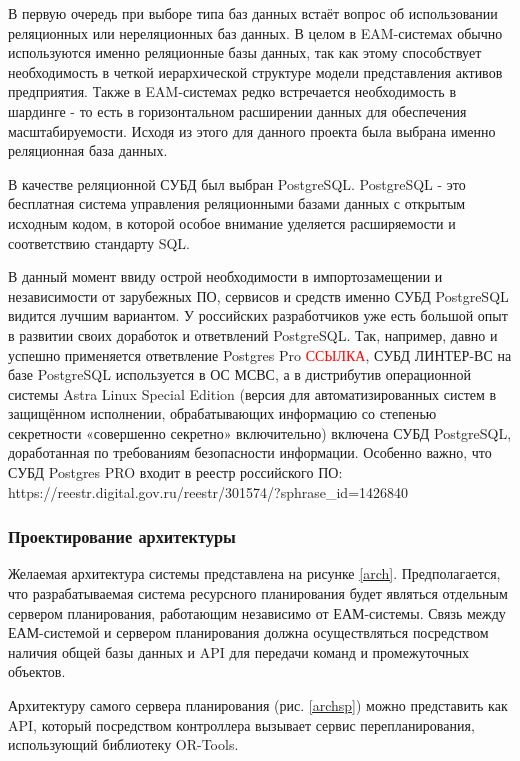 В первую очередь при выборе типа баз данных встаёт вопрос об использовании реляционных или нереляционных баз данных. В целом в EAM-системах обычно используются именно реляционные базы данных, так как этому способствует необходимость в четкой иерархической структуре модели представления активов предприятия. Также в EAM-системах редко встречается необходимость в шардинге - то есть в горизонтальном расширении данных для обеспечения масштабируемости. Исходя из этого для данного проекта была выбрана именно реляционная база данных.

В качестве реляционной СУБД был выбран PostgreSQL. PostgreSQL - это бесплатная система управления реляционными базами данных с открытым исходным кодом, в которой особое внимание уделяется расширяемости и соответствию стандарту SQL.

В данный момент ввиду острой необходимости в импортозамещении и независимости от зарубежных ПО, сервисов и средств именно СУБД PostgreSQL видится лучшим вариантом. У российских разработчиков уже есть большой опыт в развитии своих доработок и ответвлений PostgreSQL. Так, например, давно и успешно применяется ответвление Postgres Pro \textcolor{red}{ССЫЛКА}, СУБД ЛИНТЕР-ВС на базе PostgreSQL используется в ОС МСВС, а в дистрибутив операционной системы Astra Linux Special Edition (версия для автоматизированных систем в защищённом исполнении, обрабатывающих информацию со степенью секретности «совершенно секретно» включительно) включена СУБД PostgreSQL, доработанная по требованиям безопасности информации. Особенно важно, что СУБД Postgres PRO входит в реестр российского ПО: https://reestr.digital.gov.ru/reestr/301574/?sphrase\_id=1426840

\subsubsection{Проектирование архитектуры}

Желаемая архитектура системы представлена на рисунке \ref{arch}. Предполагается, что разрабатываемая система ресурсного планирования будет являться отдельным сервером планирования, работающим независимо от ЕАМ-системы. Связь между ЕАМ-системой и сервером планирования должна осуществляться посредством наличия общей базы данных и API для передачи команд и промежуточных объектов.


Архитектуру самого сервера планирования (рис. \ref{archsp}) можно представить как API, который посредством контроллера вызывает сервис перепланирования, использующий библиотеку OR-Tools.

